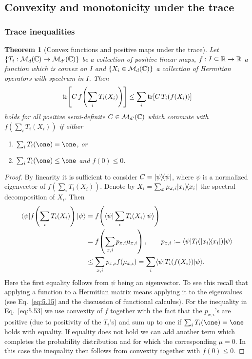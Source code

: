 \documentclass[11pt,a4paper]{article}
\theoremstyle{plain}
\newtheorem{theorem}{Theorem}[section]
\theoremstyle{definition}
\theoremstyle{remark}
\numberwithin{equation}{section}
\begin{document}
\subsection{Convexity and monotonicity under the trace}

\subsubsection*{Trace inequalities}

\begin{theorem}[Convex functions and positive maps under the trace]
    Let $\{T_i:\mathcal{M}_d(\mathbb{C})\to \mathcal{M}_{d'}(\mathbb{C})\}$ be a collection of positive linear maps,
    $f:I\subseteq \mathbb{R} \to \mathbb{R}$ a function which is convex on $I$ and
    $\{X_i\in \mathcal{M}_d(\mathbb{C})\}$ a collection of Hermitian operators with spectrum in $I$.
    Then
    \begin{equation}\label{eq:5.51}
        \operatorname{tr}\!\left[C\, f\!\left(\sum_i T_i(X_i)\right)\right]
        \le
        \sum_i \operatorname{tr}\!\left[C\, T_i(f(X_i))\right]
    \end{equation}
    holds for all positive semi-definite $C\in \mathcal{M}_{d'}(\mathbb{C})$ which commute with
    $f\!\left(\sum_i T_i(X_i)\right)$ if either
    \begin{enumerate}
        \item $\sum_i T_i(\one)=\one$, or
        \item $\sum_i T_i(\one)\le \one$ and $f(0)\le 0$.
    \end{enumerate}
\end{theorem}

\begin{proof}
    By linearity it is sufficient to consider $C=|\psi\rangle\!\langle\psi|$, where $\psi$ is a
    normalized eigenvector of $f\!\left(\sum_i T_i(X_i)\right)$. Denote by
    $X_i=\sum_x \mu_{x,i}|x_i\rangle\!\langle x_i|$ the spectral decomposition of $X_i$. Then
    \begin{align}
        \langle\psi| f\!\left(\sum_i T_i(X_i)\right)|\psi\rangle
         &= f\!\left(\langle\psi|\sum_i T_i(X_i)|\psi\rangle\right) \label{eq:5.52}\\
         &= f\!\left(\sum_{x,i} p_{x,i}\mu_{x,i}\right),
        \qquad p_{x,i}:=\langle\psi|T_i(|x_i\rangle\!\langle x_i|)|\psi\rangle \nonumber\\
         &\le \sum_{x,i} p_{x,i} f(\mu_{x,i})
        = \sum_i \langle\psi| T_i(f(X_i))|\psi\rangle.
        \label{eq:5.53}
    \end{align}
    Here the first equality follows from $\psi$ being an eigenvector. To see this recall
    that applying a function to a Hermitian matrix means applying it to the eigenvalues
    (see Eq.~\eqref{eq:5.15} and the discussion of functional calculus). For the
    inequality in Eq.~\eqref{eq:5.53} we use convexity of $f$ together with the fact that
    the $p_{x,i}$'s are positive (due to positivity of the $T_i$'s) and sum up to one if
    $\sum_i T_i(\one)=\one$ holds with equality. If equality does not hold we can add
    another term which completes the probability distribution and for which the
    corresponding $\mu=0$. In this case the inequality then follows from convexity
    together with $f(0)\le 0$.
\end{proof}
\end{document}

